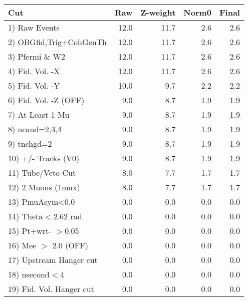  \begin{table}[h!]\centering
 \begin{tabular}{||l||r|r|r|r||}
 \hline
 \hline
 Cut & Raw & Z-weight & Norm0 & Final \\
 \hline
  1) Raw Events           &        12.0 &        11.7 &         2.6 &         2.6 \\
  2) OBGfid,Trig+CohGenTh &        12.0 &        11.7 &         2.6 &         2.6 \\
  3) Pfermi \& W2         &        12.0 &        11.7 &         2.6 &         2.6 \\
  4) Fid. Vol. -X         &        12.0 &        11.7 &         2.6 &         2.6 \\
  5) Fid. Vol. -Y         &        10.0 &         9.7 &         2.2 &         2.2 \\
  6) Fid. Vol. -Z (OFF)   &         9.0 &         8.7 &         1.9 &         1.9 \\
  7) At Least 1 Mu        &         9.0 &         8.7 &         1.9 &         1.9 \\
  8) ncand=2,3,4          &         9.0 &         8.7 &         1.9 &         1.9 \\
  9) tnchgd=2             &         9.0 &         8.7 &         1.9 &         1.9 \\
 10) +/- Tracks (V0)      &         9.0 &         8.7 &         1.9 &         1.9 \\
 11) Tube/Veto Cut        &         8.0 &         7.7 &         1.7 &         1.7 \\
 12) 2 Muons (1mux)       &         8.0 &         7.7 &         1.7 &         1.7 \\
 13) PmuAsym<0.0          &         0.0 &         0.0 &         0.0 &         0.0 \\
 14) Theta$<$2.62 rad     &         0.0 &         0.0 &         0.0 &         0.0 \\
 15) Pt+wrt- $>$0.05      &         0.0 &         0.0 &         0.0 &         0.0 \\
 16) Mee $>$ 2.0  (OFF)   &         0.0 &         0.0 &         0.0 &         0.0 \\
 17) Upstream Hanger cut  &         0.0 &         0.0 &         0.0 &         0.0 \\
 18) nsecond$<$4          &         0.0 &         0.0 &         0.0 &         0.0 \\
 19) Fid. Vol. Hanger cut &         0.0 &         0.0 &         0.0 &         0.0 \\

\end{tabular}
\end{table}
